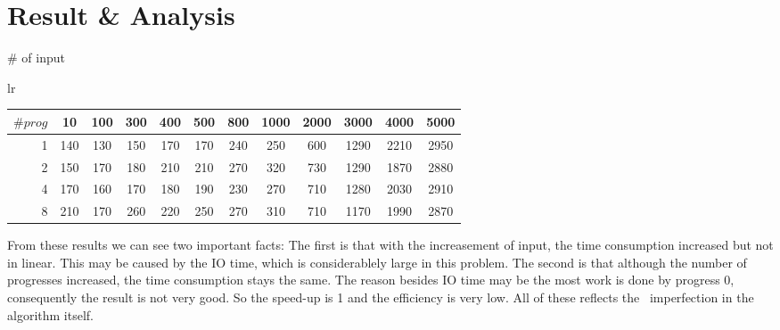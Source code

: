 \documentclass{article}
\begin{document}
\section{Result \& Analysis}
\begin{center}
	\# of input
\begin{tabular}{lr}
  \begin{tabular}[t]{r|ccccccccccc}
$\# prog$&10&100&300&400&500&800&1000&2000&3000&4000&5000\\
\hline
1&140&130&150&170&170&240&250&600&1290&2210&2950\\
2&150&170&180&210&210&270&320&730&1290&1870&2880\\
4&170&160&170&180&190&230&270&710&1280&2030&2910\\
8&210&170&260&220&250&270&310&710&1170&1990&2870\\
  \end{tabular}
 \end{tabular}
\end{center}
From these results we can see two important facts: The first is that with the increasement of input, the time consumption increased but not in linear. This may be caused by the IO time, which is considerablely large in this problem. The second is that although the number of progresses increased, the time consumption stays the same. The reason besides IO time may be the most work is done by progress 0, consequently the result is not very good. So the speed-up is 1 and the efficiency is very low. All of these reflects the  imperfection in the algorithm itself.
\end{document}
